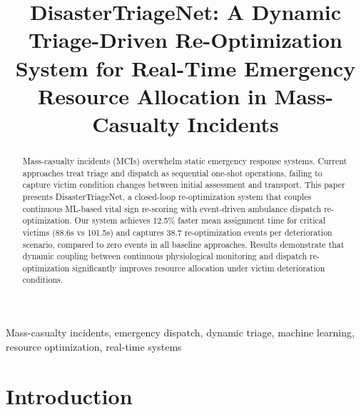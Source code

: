 \documentclass[conference]{IEEEtran}
\begin{document}
\title{DisasterTriageNet: A Dynamic Triage-Driven Re-Optimization System for Real-Time Emergency Resource Allocation in Mass-Casualty Incidents}

\author{
}

\maketitle

\begin{abstract}
Mass-casualty incidents (MCIs) overwhelm static emergency response systems. Current approaches treat triage and dispatch as sequential one-shot operations, failing to capture victim condition changes between initial assessment and transport. This paper presents DisasterTriageNet, a closed-loop re-optimization system that couples continuous ML-based vital sign re-scoring with event-driven ambulance dispatch re-optimization. Our system achieves 12.5\% faster mean assignment time for critical victims (88.6s vs 101.5s) and captures 38.7 re-optimization events per deterioration scenario, compared to zero events in all baseline approaches. Results demonstrate that dynamic coupling between continuous physiological monitoring and dispatch re-optimization significantly improves resource allocation under victim deterioration conditions.
\end{abstract}

\begin{IEEEkeywords}
Mass-casualty incidents, emergency dispatch, dynamic triage, machine learning, resource optimization, real-time systems
\end{IEEEkeywords}

\section{Introduction}
\end{document}
